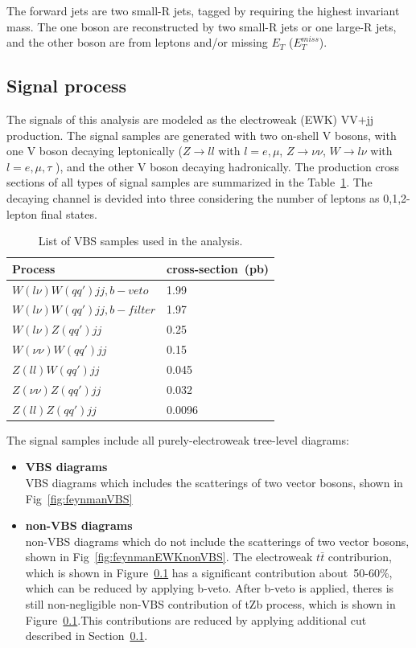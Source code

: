 The forward jets are two small-R jets, tagged by requiring the highest invariant mass. The one boson are reconstructed by two small-R jets or one large-R jets, and the other boson are from leptons and/or missing $E_T$ ($E_T^{miss}$).

\subsection{Signal process}

The signals of this analysis are modeled as the electroweak (EWK) VV$\plus$jj production. The signal samples are generated with two on-shell V bosons, with one V boson decaying leptonically ($Z \rightarrow ll$ with $l = e,\mu$, $Z \rightarrow \nu\nu$, $W\rightarrow l\nu$ with $l = e,\mu,\tau$ ), and the other V boson decaying hadronically. The production cross sections of all types of signal samples are summarized in the Table~\ref{tab:VBS_sig_samples}. The decaying channel is devided into three considering the number of leptons as 0,1,2-lepton final states. 

\begin{table}[!htbp]
\begin{center}
\small
\begin{tabular}{|l|l|}
\hline
Process & cross-section~(pb) \\
\hline
$W(l\nu)W(qq\prime)jj,b-veto$     & 1.99    \\
$W(l\nu)W(qq\prime)jj,b-filter$   &  1.97   \\
$W(l\nu)Z(qq\prime)jj$            &  0.25   \\
$W(\nu\nu)W(qq\prime)jj$          &  0.15   \\
$Z(ll)W(qq\prime)jj$              &  0.045  \\
$Z(\nu\nu)Z(qq\prime)jj$          &  0.032  \\
$Z(ll)Z(qq\prime)jj$              &  0.0096 \\
\hline
\end{tabular}
\caption{List of VBS samples used in the analysis.
}
\label{tab:VBS_sig_samples}
\end{center}
\end{table}

The signal samples include all purely-electroweak tree-level diagrams:
\begin{itemize}
    \item \textbf{VBS diagrams} 
    \\ VBS diagrams which includes the scatterings of two vector bosons, shown in Fig~\ref{fig:feynmanVBS}
    \item \textbf{non-VBS diagrams} 
    \\ non-VBS diagrams which do not include the scatterings of two vector bosons, shown in Fig~\ref{fig:feynmanEWKnonVBS}. The electroweak $t\bar{t}$ contriburion, which is shown in Figure~\ref{} has a significant contribution about~50-60\%, which can be reduced by applying b-veto. After b-veto is applied, theres is still non-negligible non-VBS contribution of tZb process, which is shown in Figure~\ref{}.This contributions are reduced by applying additional cut described in Section~\ref{}.
\end{itemize}

